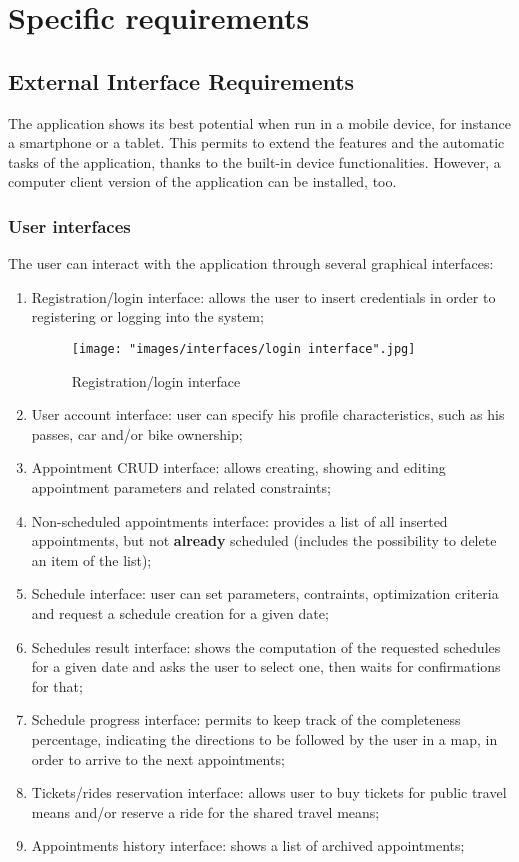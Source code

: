 \chapter{Specific requirements}

\section{External Interface Requirements}
The application shows its best potential when run in a mobile device, for instance a smartphone or a tablet. This permits to extend the features and the automatic tasks of the application, thanks to the built-in device functionalities. However, a computer client version of the application can be installed, too.

\subsection{User interfaces}
The user can interact with the application through several graphical interfaces:
\begin{enumerate}
\item Registration/login interface: allows the user to insert credentials in order to registering or logging into the system;
\begin{figure}[H]
\begin{center}
\texttt{[image: "images/interfaces/login interface".jpg]}
\caption{Registration/login interface}
\end{center}
\end{figure}
\item User account interface: user can specify his profile characteristics, such as his passes, car and/or bike ownership;
\item Appointment CRUD interface: allows creating, showing and editing appointment parameters and related constraints;
\item Non-scheduled appointments interface: provides a list of all inserted appointments, but not \textbf{already} scheduled (includes the possibility to delete an item of the list);
\item Schedule interface: user can set parameters, contraints, optimization criteria and request a schedule creation for a given date;
\item Schedules result interface: shows the computation of the requested schedules for a given date and asks the user to select one, then waits for confirmations for that;
\item Schedule progress interface: permits to keep track of the completeness percentage, indicating the directions to be followed by the user in a map, in order to arrive to the next appointments;
\item Tickets/rides reservation interface: allows user to buy tickets for public travel means and/or reserve a ride for the shared travel means;
\item Appointments history interface: shows a list of archived appointments;
\end{enumerate}

